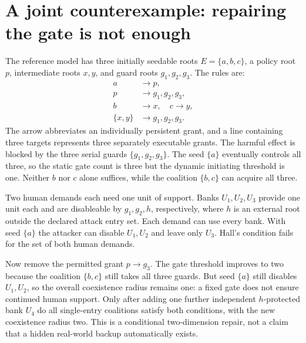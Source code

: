 \documentclass[11pt,a4paper]{article}
\theoremstyle{definition}\newtheorem{definition}{Definition}
\begin{document}
\section{A joint counterexample: repairing the gate is not enough}
\label{sec:jointexample}
The reference model has three initially seedable roots $E=\{a,b,c\}$, a policy root $p$, intermediate roots $x,y$, and guard roots $g_1,g_2,g_3$. The rules are:
\begin{equation}
\begin{aligned}
 a&\rightarrow p,\\ p&\rightarrow g_1,g_2,g_3,\\
 b&\rightarrow x,\quad c\rightarrow y,\\
 \{x,y\}&\rightarrow g_1,g_2,g_3.
\end{aligned}
\end{equation}
The arrow abbreviates an individually persistent grant, and a line containing three targets represents three separately executable grants. The harmful effect is blocked by the three serial guards $\{g_1,g_2,g_3\}$. The seed $\{a\}$ eventually controls all three, so the static gate count is three but the dynamic initiating threshold is one. Neither $b$ nor $c$ alone suffices, while the coalition $\{b,c\}$ can acquire all three.

Two human demands each need one unit of support. Banks $U_1,U_2,U_3$ provide one unit each and are disableable by $g_1,g_2,h$, respectively, where $h$ is an external root outside the declared attack entry set. Each demand can use every bank. With seed $\{a\}$ the attacker can disable $U_1,U_2$ and leave only $U_3$. Hall's condition fails for the set of both human demands.

Now remove the permitted grant $p\rightarrow g_3$. The gate threshold improves to two because the coalition $\{b,c\}$ still takes all three guards. But seed $\{a\}$ still disables $U_1,U_2$, so the overall coexistence radius remains one: a fixed gate does not ensure continued human support. Only after adding one further independent $h$-protected bank $U_4$ do all single-entry coalitions satisfy both conditions, with the new coexistence radius two. This is a conditional two-dimension repair, not a claim that a hidden real-world backup automatically exists.
\end{document}
